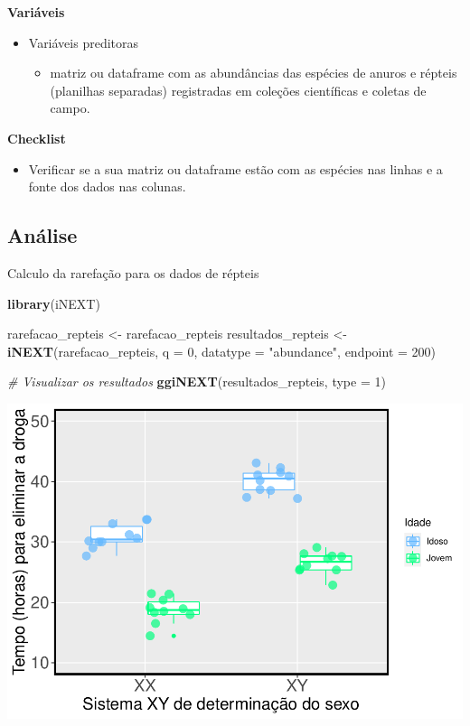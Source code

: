 \documentclass[
]{book}
\newenvironment{Shaded}{\begin{snugshade}}{\end{snugshade}}
\newcommand{\CommentTok}[1]{\textcolor[rgb]{0.56,0.35,0.01}{\textit{#1}}}
\newcommand{\DataTypeTok}[1]{\textcolor[rgb]{0.13,0.29,0.53}{#1}}
\newcommand{\DecValTok}[1]{\textcolor[rgb]{0.00,0.00,0.81}{#1}}
\newcommand{\KeywordTok}[1]{\textcolor[rgb]{0.13,0.29,0.53}{\textbf{#1}}}
\newcommand{\NormalTok}[1]{#1}
\newcommand{\StringTok}[1]{\textcolor[rgb]{0.31,0.60,0.02}{#1}}
\providecommand{\tightlist}{%
  \setlength{\itemsep}{0pt}\setlength{\parskip}{0pt}}
\begin{document}
\textbf{Variáveis}

\begin{itemize}
\tightlist
\item
  Variáveis preditoras

  \begin{itemize}
  \tightlist
  \item
    matriz ou dataframe com as abundâncias das espécies de anuros e répteis (planilhas separadas) registradas em coleções científicas e coletas de campo.
  \end{itemize}
\end{itemize}

\textbf{Checklist}

\begin{itemize}
\tightlist
\item
  Verificar se a sua matriz ou dataframe estão com as espécies nas linhas e a fonte dos dados nas colunas.
\end{itemize}

\hypertarget{anuxe1lise-1}{%
\subsection{Análise}\label{anuxe1lise-1}}

Calculo da rarefação para os dados de répteis

\begin{Shaded}
\begin{Highlighting}[]
\KeywordTok{library}\NormalTok{(iNEXT)}

\NormalTok{rarefacao_repteis <-}\StringTok{ }\NormalTok{rarefacao_repteis}
\NormalTok{resultados_repteis <-}\StringTok{ }\KeywordTok{iNEXT}\NormalTok{(rarefacao_repteis, }\DataTypeTok{q =} \DecValTok{0}\NormalTok{, }\DataTypeTok{datatype =} \StringTok{"abundance"}\NormalTok{, }\DataTypeTok{endpoint =} \DecValTok{200}\NormalTok{)}

\CommentTok{# Visualizar os resultados }
\KeywordTok{ggiNEXT}\NormalTok{(resultados_repteis, }\DataTypeTok{type =} \DecValTok{1}\NormalTok{)}
\end{Highlighting}
\end{Shaded}

\includegraphics{livro_r_ecologia_files/figure-latex/unnamed-chunk-18-1.pdf}
\end{document}
